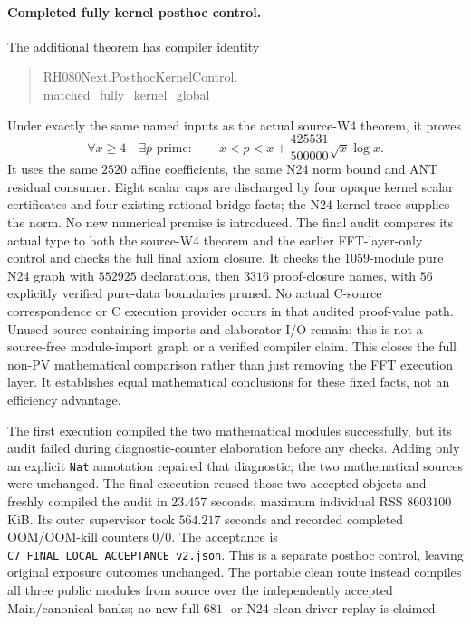 \documentclass[11pt]{article}
\begin{document}
\paragraph{Completed fully kernel posthoc control.}
The additional theorem has compiler identity
\begin{quote}\ttfamily\small
RH080Next.PosthocKernelControl.\\
matched\_fully\_kernel\_global
\end{quote}
Under exactly the same named inputs as the actual source-W4 theorem, it proves
\[
 \forall x\ge4\quad\exists p\text{ prime}:\qquad
 x<p<x+\frac{425531}{500000}\sqrt{x}\log x.
\]
It uses the same \(2520\) affine coefficients, the same N24 norm bound and
ANT residual consumer. Eight scalar caps are discharged by four opaque
kernel scalar certificates and four existing rational bridge facts; the
N24 kernel trace supplies the norm. No new numerical premise is introduced.
The final audit compares its actual type to both the source-W4 theorem and
the earlier FFT-layer-only control and checks the full final axiom closure.
It checks the \(1059\)-module pure N24 graph with \(552925\) declarations,
then \(3316\) proof-closure names, with \(56\) explicitly verified pure-data
boundaries pruned. No actual C-source correspondence or C execution provider
occurs in that audited proof-value path. Unused source-containing imports and
elaborator I/O remain; this is not a source-free module-import graph or a
verified compiler claim. This closes the full non-PV mathematical comparison
rather than just removing the FFT execution layer. It establishes equal
mathematical conclusions for these fixed facts, not an efficiency advantage.

The first execution compiled the two mathematical modules successfully, but
its audit failed during diagnostic-counter elaboration before any checks.
Adding only an explicit \texttt{Nat} annotation repaired that diagnostic;
the two mathematical sources were unchanged. The final execution reused
those two accepted objects and freshly compiled the audit in \(23.457\)
seconds, maximum individual RSS \(8603100\) KiB. Its outer supervisor took
\(564.217\) seconds and recorded completed OOM/OOM-kill counters \(0/0\).
The acceptance is \nolinkurl{C7_FINAL_LOCAL_ACCEPTANCE_v2.json}. This is a
separate posthoc control, leaving original exposure outcomes unchanged.
The portable clean route instead compiles all three public modules from
source over the independently accepted Main/canonical banks; no new full
\(681\)- or N24 clean-driver replay is claimed.
\end{document}
